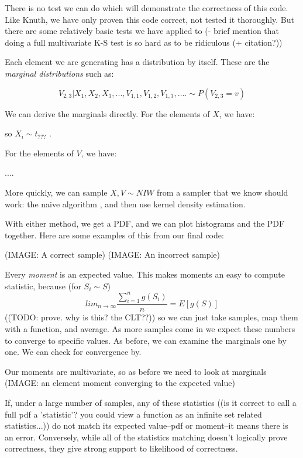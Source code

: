 \documentclass[english]{report}
\begin{document}
There is no test we can do which will demonstrate the correctness of this code.
Like Knuth, we have only proven this code correct, not tested it thoroughly.
But there are some relatively basic tests we have applied to 
(- brief mention that doing a full multivariate K-S test is so hard as to be ridiculous (+ citation?))

Each element we are generating has a distribution by itself. These are the \emph{marginal distributions} such as:

$$ V_{2,3} | X_1, X_2, X_3, ..., V_{1,1}, V_{1,2}, V_{1,3} , ....  \sim P(V_{2,3} = v) $$

We can derive the marginals directly. For the elements of $X$, we have:


so  $X_i \sim t_{???}$ .

For the elements of $V$, we have:

....


More quickly, we can sample $X,V \sim NIW$ from a sampler that we know should work: the naive algorithm %
  , and then use kernel density estimation.
  
With either method, we get a PDF, and we can plot histograms and the PDF together. Here are some examples of this from our final code:

(IMAGE: A correct sample)
(IMAGE: An incorrect sample)


Every \emph{moment} is an expected value. This makes moments an easy to compute statistic,
 because (for $ S_i \sim S $)
$$ lim_{n \rightarrow \infty} \frac{\sum_{i=1}^n g(S_i)}{n} = E[g(S)] $$
  ((TODO: prove. why is this? the CLT??))
so we can just take samples, map them with a function, and average. As more samples come in we expect these numbers to converge to specific values. As before, we can examine the marginals one by one. We can check for convergence by.

Our moments are multivariate, so as before we need to look at marginals 
(IMAGE: an element moment converging to the expected value)

If, under a large number of samples, any of these statistics ((is it correct to call a full pdf a 'statistic'? you could view a function as an infinite set related statistics...)) do not match its expected value--pdf or moment--it means there is an error. Conversely, while all of the statistics matching doesn't logically prove correctness, they give strong support to likelihood of correctness.
\end{document}
